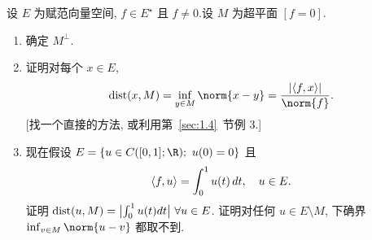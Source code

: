 \begin{exercise}
\label{exer:1.17}
设 $E$ 为赋范向量空间, $f\in E^\star$ 且 $f\ne0$.设 $M$ 为超平面 $[f=0]$.

\begin{enumerate}[label=\arabic*., leftmargin=2.2em, itemsep=0.25em]
	\item 确定 $M^\perp$.
	\item 证明对每个 $x\in E$,
	      \begin{equation*}
	      \dist(x,M)=\inf_{y\in M}\norm{x-y}=\frac{\abs{\dual{f}{x}}}{\norm{f}}.
	      \end{equation*}
	      [找一个直接的方法, 或利用第~\ref{sec:1.4}~节例 3.]
	\item 现在假设 $E=\{u\in C([0,1];\R);\ u(0)=0\}$ 且
	      \begin{equation*}
	      \left\langle f,u\right\rangle=\int_0^1 u(t)\,dt,\quad u\in E.
	      \end{equation*}
	      证明 $\operatorname{dist}(u,M)=\bigl|\int_0^1u(t)dt\bigr|\ \forall u\in E$.
	      证明对任何 $u\in E\setminus M$, 下确界 $\inf_{v\in M}\norm{u-v}$ 都取不到.
\end{enumerate}
\end{exercise}

